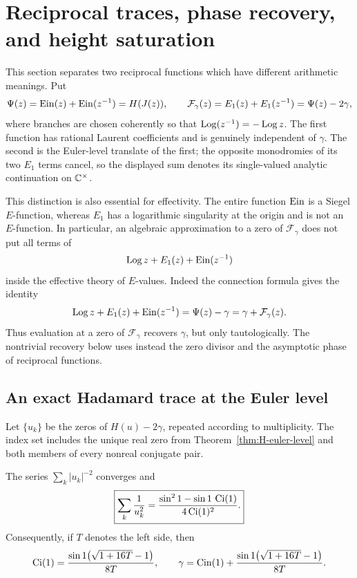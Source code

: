 \section{Reciprocal traces, phase recovery, and height saturation}
\label{sec:reciprocal-trace-height}

This section separates two reciprocal functions which have different
arithmetic meanings.  Put
\begin{equation}\label{eq:Psi-and-Fgamma}
 \Psi(z)=\operatorname{Ein}(z)+\operatorname{Ein}(z^{-1})=H(J(z)),
 \qquad
 \mathcal F_\gamma(z)=E_1(z)+E_1(z^{-1})=\Psi(z)-2\gamma,
\end{equation}
where branches are chosen coherently so that
$\operatorname{Log}(z^{-1})=-\operatorname{Log} z$.  The first function has rational Laurent
coefficients and is genuinely independent of $\gamma$.  The second is the
Euler-level translate of the first; the opposite monodromies of its two
$E_1$ terms cancel, so the displayed sum denotes its single-valued analytic
continuation on $\mathbb C^\times$.

This distinction is also essential for effectivity.  The entire function
$\operatorname{Ein}$ is a Siegel $E$-function, whereas $E_1$ has a logarithmic
singularity at the origin and is not an $E$-function.  In particular,
an algebraic approximation to a zero of $\mathcal F_\gamma$ does not put all
terms of
\[
 \operatorname{Log} z+E_1(z)+\operatorname{Ein}(z^{-1})
\]
inside the effective theory of $E$-values.  Indeed the connection formula
gives the identity
\begin{equation}\label{eq:tautological-recovery}
 \operatorname{Log} z+E_1(z)+\operatorname{Ein}(z^{-1})
 =\Psi(z)-\gamma=\gamma+\mathcal F_\gamma(z).
\end{equation}
Thus evaluation at a zero of $\mathcal F_\gamma$ recovers $\gamma$, but
only tautologically.  The nontrivial recovery below uses instead the zero
divisor and the asymptotic phase of reciprocal functions.

\subsection{An exact Hadamard trace at the Euler level}

Let $\{u_k\}$ be the zeros of $H(u)-2\gamma$, repeated according to
multiplicity.  The index set includes the unique real zero from
Theorem~\ref{thm:H-euler-level} and both members of every nonreal conjugate
pair.

\begin{theorem}
\label{thm:euler-hadamard-trace}
The series $\sum_k |u_k|^{-2}$ converges and
\begin{equation}\label{eq:euler-hadamard-trace}
 \boxed{
 \sum_k\frac{1}{u_k^2}
 =\frac{\sin^2 1-\sin 1\,\operatorname{Ci}(1)}{4\operatorname{Ci}(1)^2}.}
\end{equation}
Consequently, if $T$ denotes the left side, then
\begin{equation}\label{eq:trace-inversion}
 \operatorname{Ci}(1)=
 \frac{\sin 1\bigl(\sqrt{1+16T}-1\bigr)}{8T},
 \qquad
 \gamma=\operatorname{Cin}(1)+
 \frac{\sin 1\bigl(\sqrt{1+16T}-1\bigr)}{8T}.
\end{equation}
\end{theorem}

